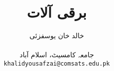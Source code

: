 \documentclass[leqno,b5paper]{book}
\author{
خالد خان یوسفزئی\\
\\
{\small {جامعہ کامسیٹ، اسلام آباد}}\\
\texttt{khalidyousafzai@comsats.edu.pk}
}
\title{برقی آلات}
\date{}                           %
\begin{document}
\begin{urdufont}

\renewcommand*{\contentsname}{عنوان}    %

\frontmatter                          %

\maketitle


\tableofcontents
\pagestyle{empty}
%



\mainmatter                      %
\renewcommand*{\chaptername}{باب}

\pagestyle{headings}











\backmatter

\renewcommand*{\indexname}{فرہنگ}      %
\cleardoublepage
{}
\printindex

\end{urdufont}
\end{document}
